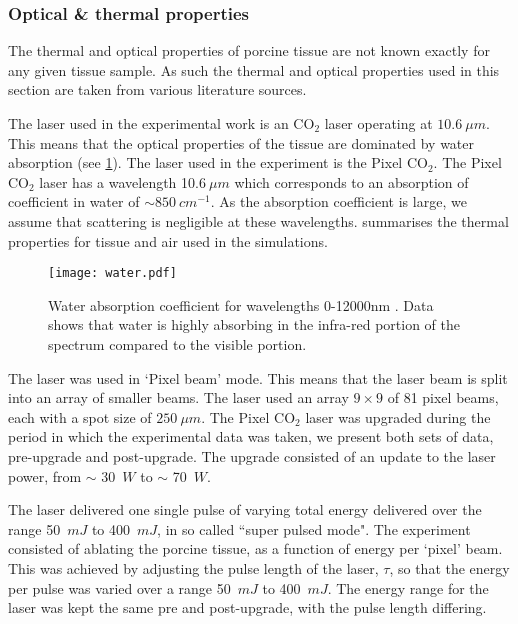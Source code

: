 \subsubsection*{Optical \& thermal properties}
\label{sec:opticalprops}
The thermal and optical properties of porcine tissue are not known exactly for any given tissue sample. As such the thermal and optical properties used in this section are taken from various literature sources.

The laser used in the experimental work is an CO$_2$ laser operating at $10.6\ \mu m$. This means that the optical properties of the tissue are dominated by water absorption (see \cref{fig:waterabsor}). The laser used in the experiment is the Pixel CO$_2$\cite{pixelco2}. The Pixel CO$_2$ laser has a wavelength 10.6$~\mu m$ which corresponds to an absorption of coefficient in water of $\sim 850~cm^{-1}$. As the absorption coefficient is large, we assume that scattering is negligible at these wavelengths.
 summarises the thermal properties for tissue and air used in the simulations.  

\begin{figure}	
	\centering
	\texttt{[image: water.pdf]}
	\caption{Water absorption coefficient for wavelengths 0-12000nm \cite{segelstein1981complex}. Data shows that water is highly absorbing in the infra-red portion of the spectrum  compared to the visible portion.}
	\label{fig:waterabsor}
\end{figure}


The laser was used in `Pixel beam' mode. This means that the laser beam is split into an array of smaller beams. The laser used an array $9 \times 9$ of 81 pixel beams, each with a spot size of $250\ \mu m$. The Pixel CO$_2$ laser was upgraded during the period in which the experimental data was taken, we present both sets of data, pre-upgrade and post-upgrade. The upgrade consisted of an update to the laser power, from $\sim$ 30~$W$ to $\sim$ 70~$W$.

The laser delivered one single pulse of varying total energy delivered over the range 50~$mJ$ to 400~$mJ$, in so called ``super pulsed mode". The experiment consisted of ablating the porcine tissue, as a function of energy per `pixel' beam. This was achieved by adjusting the pulse length of the laser, $\tau$, so that the energy per pulse was varied over a range 50~$mJ$ to 400~$mJ$. The energy range for the laser was kept the same pre and post-upgrade, with the pulse length differing.

